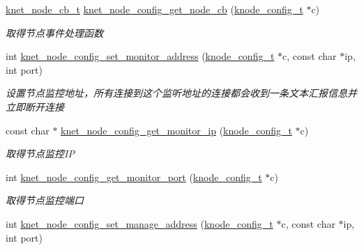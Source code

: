 \begin{DoxyCompactItemize}
\hyperlink{a00066_a09c2d1f8eef7dc82226691ce39b7c4d8_a09c2d1f8eef7dc82226691ce39b7c4d8}{knet\+\_\+node\+\_\+cb\+\_\+t} \hyperlink{a00104_a60db9a0173d2840b8626f617ee79752f_a60db9a0173d2840b8626f617ee79752f}{knet\+\_\+node\+\_\+config\+\_\+get\+\_\+node\+\_\+cb} (\hyperlink{a00066_af1cfaee0eb1c76ebf06076b95cc47ee1_af1cfaee0eb1c76ebf06076b95cc47ee1}{knode\+\_\+config\+\_\+t} $\ast$c)
\begin{DoxyCompactList}\small\item\em 取得节点事件处理函数 \end{DoxyCompactList}\item 
int \hyperlink{a00104_a5e9e62b115f085ba01f865bde785a7fa_a5e9e62b115f085ba01f865bde785a7fa}{knet\+\_\+node\+\_\+config\+\_\+set\+\_\+monitor\+\_\+address} (\hyperlink{a00066_af1cfaee0eb1c76ebf06076b95cc47ee1_af1cfaee0eb1c76ebf06076b95cc47ee1}{knode\+\_\+config\+\_\+t} $\ast$c, const char $\ast$ip, int port)
\begin{DoxyCompactList}\small\item\em 设置节点监控地址，所有连接到这个监听地址的连接都会收到一条文本汇报信息并立即断开连接 \end{DoxyCompactList}\item 
const char $\ast$ \hyperlink{a00104_ae141fc5428abe1ea86d99e7099a06453_ae141fc5428abe1ea86d99e7099a06453}{knet\+\_\+node\+\_\+config\+\_\+get\+\_\+monitor\+\_\+ip} (\hyperlink{a00066_af1cfaee0eb1c76ebf06076b95cc47ee1_af1cfaee0eb1c76ebf06076b95cc47ee1}{knode\+\_\+config\+\_\+t} $\ast$c)
\begin{DoxyCompactList}\small\item\em 取得节点监控\+I\+P \end{DoxyCompactList}\item 
int \hyperlink{a00104_adbb8630f77e7d83d1b9d46012dda7d72_adbb8630f77e7d83d1b9d46012dda7d72}{knet\+\_\+node\+\_\+config\+\_\+get\+\_\+monitor\+\_\+port} (\hyperlink{a00066_af1cfaee0eb1c76ebf06076b95cc47ee1_af1cfaee0eb1c76ebf06076b95cc47ee1}{knode\+\_\+config\+\_\+t} $\ast$c)
\begin{DoxyCompactList}\small\item\em 取得节点监控端口 \end{DoxyCompactList}\item 
int \hyperlink{a00104_ad3115d36499edba688f8cab22c17d176_ad3115d36499edba688f8cab22c17d176}{knet\+\_\+node\+\_\+config\+\_\+set\+\_\+manage\+\_\+address} (\hyperlink{a00066_af1cfaee0eb1c76ebf06076b95cc47ee1_af1cfaee0eb1c76ebf06076b95cc47ee1}{knode\+\_\+config\+\_\+t} $\ast$c, const char $\ast$ip, int port)

\end{DoxyCompactItemize}
